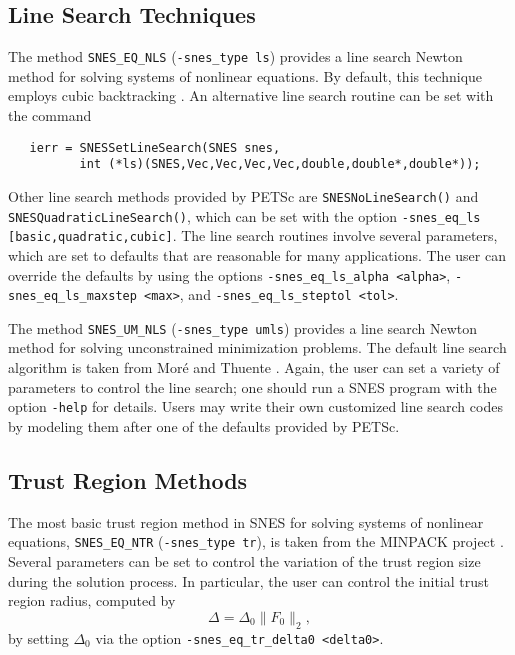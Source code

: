\subsection{Line Search Techniques} 

The method {\tt SNES\_EQ\_NLS} ({\tt -snes\_type ls}) provides a line
search Newton method for solving systems of nonlinear equations.  By
default, this technique employs cubic backtracking \cite{dennis:83}.
An alternative line search routine can be set with the command
\begin{verbatim}
   ierr = SNESSetLineSearch(SNES snes,
          int (*ls)(SNES,Vec,Vec,Vec,Vec,double,double*,double*));
\end{verbatim}
Other line search methods provided by PETSc are 
{\tt SNESNoLineSearch()} 
and {\tt SNESQuadraticLineSearch()}, 
which can be set with the option
{\tt -snes\_eq\_ls [basic,quadratic,cubic]}. 
The line search routines involve several parameters, which are set
to defaults that are reasonable for many applications.  The user
can override the defaults by using the options
{\tt -snes\_eq\_ls\_alpha <alpha>}, 
{\tt -snes\_eq\_ls\_maxstep <max>}, and 
{\tt -snes\_eq\_ls\_steptol <tol>}. 

The method {\tt SNES\_UM\_NLS} ({\tt -snes\_type umls}) provides a line
search Newton method for solving unconstrained minimization problems.
The default line search algorithm is taken from Mor\'{e} and Thuente
\cite{more:92}.  Again, the user can set a variety of parameters to
control the line search; one should run a SNES program with the option {\tt -help}
for details.  Users may write their own customized line search codes
by modeling them after one of the defaults provided by PETSc.

\subsection{Trust Region Methods}

The most basic trust region method in SNES for solving systems of nonlinear
equations, {\tt SNES\_EQ\_NTR} ({\tt-snes\_type tr}), is taken from
the MINPACK project \cite{more84}. Several parameters can be set to
control the variation of the trust region size during the solution
process.  In particular, the user can control the initial trust region
radius, computed by
\[
  \Delta = \Delta_0 \| F_0 \|_2,
\]
by setting $ \Delta_0 $ via the option 
{\tt -snes\_eq\_tr\_delta0 <delta0>}.

